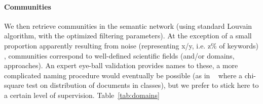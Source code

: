 \paragraph{Communities}

We then retrieve communities in the semantic network (using standard Louvain algorithm, with the optimized filtering parameters). At the exception of a small proportion apparently resulting from noise (representing x/y, i.e. z\% of keywords) %
, communities correspond to well-defined scientific fields (and/or domains, approaches). An expert eye-ball validation provides names to these, a more complicated naming procedure would eventually be possible (as in ~\cite{} %
 where a chi-square test on distribution of documents in classes), but we prefer to stick here to a certain level of supervision. Table~\ref{tab:domains}




